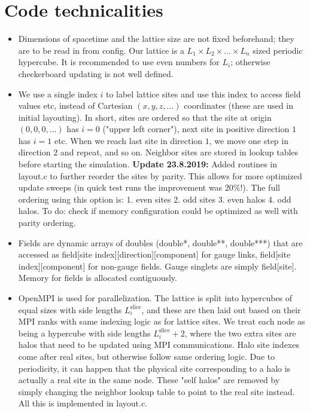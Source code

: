 \documentclass[11pt,a4paper]{article}
\begin{document}
\section{Code technicalities}

\begin{itemize}
	
	\item Dimensions of spacetime and the lattice size are not fixed beforehand; they are to be read in from config. Our lattice is a $L_1 \times L_2 \times \dots \times L_n$ sized periodic hypercube. It is recommended to use even numbers for $L_i$; otherwise checkerboard updating is not well defined. 
	
	\item We use a single index $i$ to label lattice sites and use this index to access field values etc, instead of Cartesian $(x, y, z, \dots)$ coordinates (these are used in initial layouting). In short, sites are ordered so that the site at origin $(0, 0, 0, \dots)$ has $i = 0$ ("upper left corner"), next site in positive direction $1$ has $i = 1$ etc. When we reach last site in direction $1$, we move one step in direction $2$ and repeat, and so on. Neighbor sites are stored in lookup tables before starting the simulation. \textbf{Update 23.8.2019:} Added routines in layout.c to further reorder the sites by parity. This allows for more optimized update sweeps (in quick test runs the improvement was $20\%$!). The full ordering using this option is: 1. even sites 2. odd sites 3. even halos 4. odd halos. To do: check if memory configuration could be optimized as well with parity ordering.
	
	\item Fields are dynamic arrays of doubles (double*, double**, double***) that are accessed as field[site index][direction][component] for gauge links, field[site index][component] for non-gauge fields. Gauge singlets are simply field[site]. Memory for fields is allocated contiguously. 
	
	\item OpenMPI is used for parallelization. The lattice is split into hypercubes of equal sizes with side lengths $L^\text{slice}_i$, and these are then laid out based on their MPI ranks with same indexing logic as for lattice sites. We treat each node as being a hypercube with side lengths $L^\text{slice}_i + 2$, where the two extra sites are halos that need to be updated using MPI communications. Halo site indexes come after real sites, but otherwise follow same ordering logic. Due to periodicity, it can happen that the physical site corresponding to a halo is actually a real site in the same node. These "self halos" are removed by simply changing the neighbor lookup table to point to the real site instead. All this is implemented in layout.c. 
	

\end{itemize}
\end{document}
